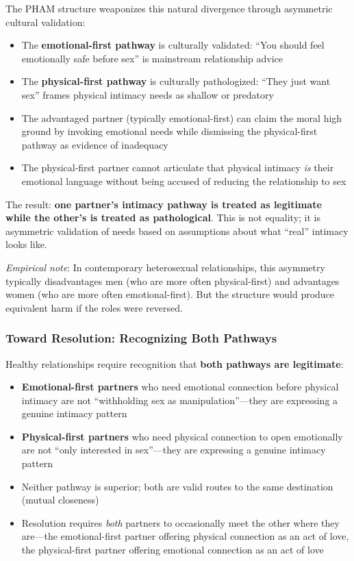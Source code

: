 \documentclass[12pt, letterpaper]{article}
\begin{document}
The PHAM structure weaponizes this natural divergence through asymmetric cultural validation:

\begin{itemize}
    \item The \textbf{emotional-first pathway} is culturally validated: ``You should feel emotionally safe before sex'' is mainstream relationship advice
    \item The \textbf{physical-first pathway} is culturally pathologized: ``They just want sex'' frames physical intimacy needs as shallow or predatory
    \item The advantaged partner (typically emotional-first) can claim the moral high ground by invoking emotional needs while dismissing the physical-first pathway as evidence of inadequacy
    \item The physical-first partner cannot articulate that physical intimacy \textit{is} their emotional language without being accused of reducing the relationship to sex
\end{itemize}

The result: \textbf{one partner's intimacy pathway is treated as legitimate while the other's is treated as pathological}. This is not equality; it is asymmetric validation of needs based on assumptions about what ``real'' intimacy looks like.

\textit{Empirical note}: In contemporary heterosexual relationships, this asymmetry typically disadvantages men (who are more often physical-first) and advantages women (who are more often emotional-first). But the structure would produce equivalent harm if the roles were reversed.

\subsubsection{Toward Resolution: Recognizing Both Pathways}

Healthy relationships require recognition that \textbf{both pathways are legitimate}:

\begin{itemize}
    \item \textbf{Emotional-first partners} who need emotional connection before physical intimacy are not ``withholding sex as manipulation''---they are expressing a genuine intimacy pattern
    \item \textbf{Physical-first partners} who need physical connection to open emotionally are not ``only interested in sex''---they are expressing a genuine intimacy pattern
    \item Neither pathway is superior; both are valid routes to the same destination (mutual closeness)
    \item Resolution requires \textit{both} partners to occasionally meet the other where they are---the emotional-first partner offering physical connection as an act of love, the physical-first partner offering emotional connection as an act of love
\end{itemize}
\end{document}

